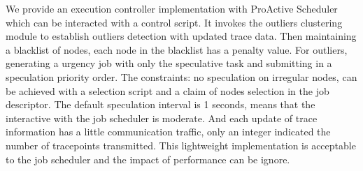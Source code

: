 We provide an execution controller implementation with ProActive Scheduler which can be interacted with  a control script. It invokes the outliers clustering module to establish outliers detection with updated trace data. Then maintaining a blacklist of nodes, each node in the blacklist has a penalty value. For outliers, generating a urgency job with only the speculative task and submitting in a speculation priority order. The constraints: no speculation on irregular nodes, can be achieved with a selection script and a claim of nodes selection in the job descriptor. The default speculation interval is 1 seconds, means that the interactive with the job scheduler is moderate. And each update of trace information has a little communication traffic, only an integer indicated the number of  tracepoints transmitted. This lightweight implementation is acceptable to the job scheduler and the impact of performance can be ignore.
